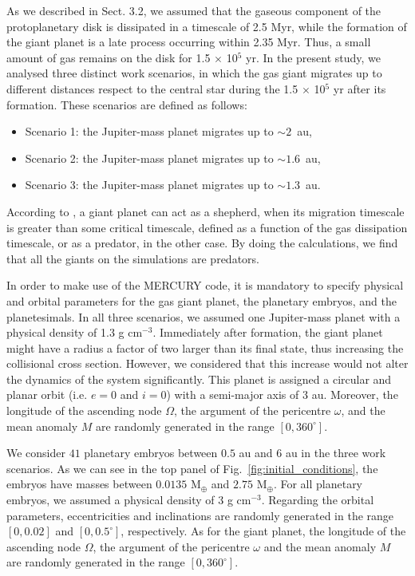 \documentclass{aa}
\begin{document}
As we described in Sect. 3.2, we assumed that the gaseous component of the protoplanetary disk is dissipated in a timescale of 2.5 Myr,
while the formation of the giant planet is a late process occurring within 2.35 Myr. Thus, a small amount of gas remains on the disk
for 1.5 $\times$ 10$^{5}$ yr. In the present study, we analysed three distinct work scenarios, in which the gas giant migrates up
to different distances respect to the central star during the 1.5 $\times$ 10$^{5}$ yr after its formation. These scenarios are defined
as follows:
\begin{itemize}
 \item Scenario 1: the Jupiter-mass planet migrates up to $\sim 2$~au,
 \item Scenario 2: the Jupiter-mass planet migrates up to $\sim 1.6$~au,
 \item Scenario 3: the Jupiter-mass planet migrates up to $\sim 1.3$~au.
\end{itemize}

According to \citet{Tanaka1999}, a giant planet can act as a shepherd, when its migration timescale is greater than some critical timescale, defined as a function of the gas dissipation timescale, or as a predator, in the other case. By doing the calculations, we find that all the giants on the simulations are predators.\bigskip

In order to make use of the MERCURY code, it is mandatory to specify physical and orbital parameters for the gas giant planet,
the planetary embryos, and the planetesimals. In all three scenarios, we assumed one Jupiter-mass planet with a physical
density of 1.3 g cm$^{-3}$. Immediately after formation, the giant planet might have a radius a factor of two larger than its final state, thus increasing the collisional cross section. However, we considered that this increase would not alter the dynamics of the system significantly. This planet is assigned a circular and planar orbit (i.e. $e=0$ and $i=0$) with a semi-major axis of
3 au. Moreover, the longitude of the ascending node $\Omega$, the argument of the pericentre $\omega$, and the mean anomaly $M$
are randomly generated in the range $[0,360^{\circ}]$.

We consider $41$ planetary embryos between $0.5$ au and $6$ au in the three work scenarios. As we can see
in the top panel of Fig.~\ref{fig:initial_conditions}, the embryos have masses between $0.0135$ M$_{\oplus}$ and $2.75$ M$_{\oplus}$.
For all planetary embryos, we assumed a physical density of $3$ g cm$^{-3}$. Regarding the orbital parameters, eccentricities and
inclinations are randomly generated in the range $[0,0.02]$ and $[0,0.5^\circ]$, respectively. As for the giant planet,
the longitude of the ascending node $\Omega$, the argument of the pericentre $\omega$ and the mean anomaly $M$ are randomly generated
in the range $[0,360^{\circ}]$.
\end{document}
